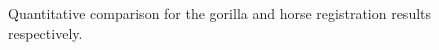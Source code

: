 %
%
%
\begin{figure}[!h]
\centering
 \caption{Quantitative comparison for the gorilla and horse registration results respectively.}
 \label{fig:errors}
\end{figure}




